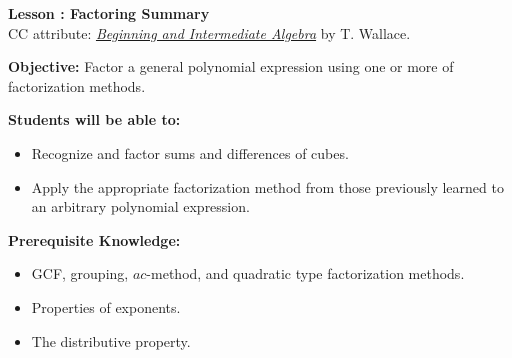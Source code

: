 \documentclass[12pt]{article}
\theoremstyle{definition}
\begin{document}
{\bf \large Lesson : Factoring Summary}\label{les:factoring_summary}
\\ CC attribute: \href{http://www.wallace.ccfaculty.org/book/book.html}{\it{Beginning and Intermediate Algebra}} by T. Wallace. 
\hfill \doclicenseImage[imagewidth=5em]\\
\par
{\bf Objective:} Factor a general polynomial expression using one or more of factorization methods.\\
\par
{\bf Students will be able to:}
\begin{itemize}
	\item Recognize and factor sums and differences of cubes.
	\item Apply the appropriate factorization method from those previously learned to an arbitrary polynomial expression.
\end{itemize}
{\bf Prerequisite Knowledge:}
\begin{itemize}
	\item GCF, grouping, $ac$-method, and quadratic type factorization methods.
	\item Properties of exponents.
	\item The distributive property.
\end{itemize}
\hrulefill
\end{document}
